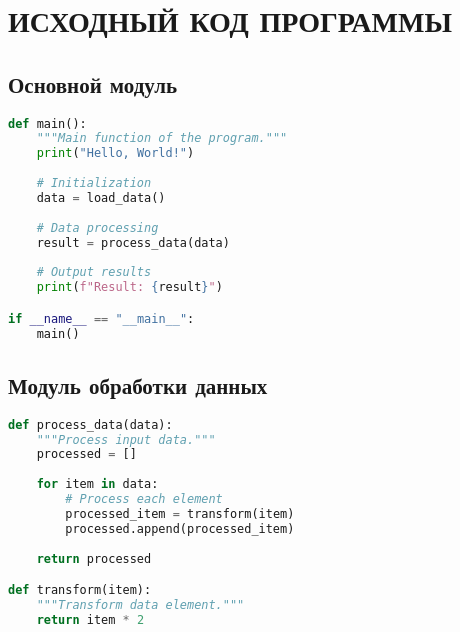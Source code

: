 \chapter{ИСХОДНЫЙ КОД ПРОГРАММЫ}

\section{Основной модуль}

\begin{lstlisting}[language=Python, caption={Основной модуль программы}]
def main():
    """Main function of the program."""
    print("Hello, World!")
    
    # Initialization
    data = load_data()
    
    # Data processing
    result = process_data(data)
    
    # Output results
    print(f"Result: {result}")

if __name__ == "__main__":
    main()
\end{lstlisting}

\section{Модуль обработки данных}

\begin{lstlisting}[language=Python, caption={Модуль обработки данных}]
def process_data(data):
    """Process input data."""
    processed = []
    
    for item in data:
        # Process each element
        processed_item = transform(item)
        processed.append(processed_item)
    
    return processed

def transform(item):
    """Transform data element."""
    return item * 2
\end{lstlisting}
